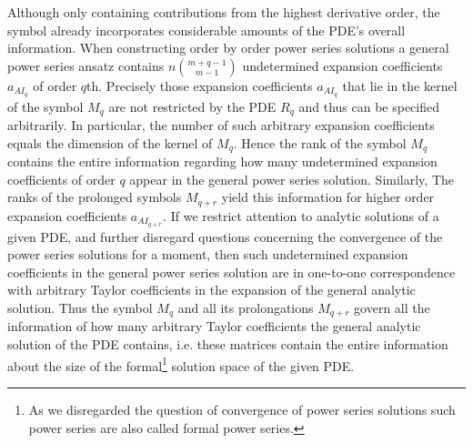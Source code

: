 Although only containing contributions from the highest derivative order, the symbol already incorporates considerable amounts of the PDE's overall information.
When constructing order by order power series solutions
a general power series ansatz contains
$n\binom{m+q-1}{m-1}$ undetermined expansion coefficients $a_{AI_q}$ of order $q$th. 
Precisely those expansion coefficients $a_{AI_q}$ that lie in the kernel of the symbol $M_q$ are not restricted by the PDE $R_q$ and thus can be specified arbitrarily. In particular, the number of such arbitrary expansion coefficients equals the dimension of the kernel of $M_q$. 
Hence the rank of the symbol $M_q$ contains the entire information regarding how many undetermined expansion coefficients of order $q$ appear in the general power series solution.
Similarly, The ranks of the prolonged symbols $M_{q+r}$ yield this information for higher order expansion coefficients $a_{AI_{q+r}}$.
If we restrict attention to analytic solutions of a given PDE, and further disregard questions concerning the convergence of the power series solutions for a moment, then such undetermined expansion coefficients in the general power series solution are in one-to-one correspondence with arbitrary Taylor coefficients in the expansion of the general analytic solution. Thus the symbol $M_q$ and all its prolongations $M_{q+r}$ govern all the information of how many arbitrary Taylor coefficients the general analytic solution of the PDE contains, i.e. these matrices contain the entire information about the size of the formal\footnote{As we disregarded the question of convergence of power series solutions such power series are also called formal power series. } solution space of the given PDE. 

